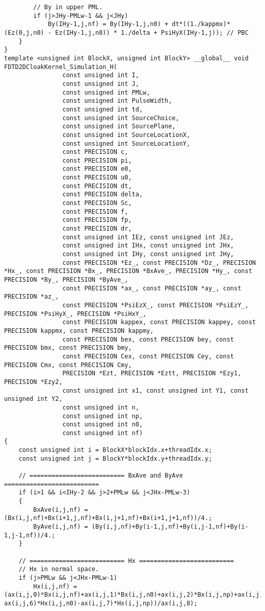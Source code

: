 \begin{lstlisting}
		// By in upper PML.
		if (j>JHy-PMLw-1 && j<JHy)
			By(IHy-1,j,nf) = By(IHy-1,j,n0) + dt*((1./kappmx)*(Ez(0,j,n0) - Ez(IHy-1,j,n0)) * 1./delta + PsiHyX(IHy-1,j)); // PBC
	}
}
template <unsigned int BlockX, unsigned int BlockY> __global__ void FDTD2DCloakKernel_Simulation_H(
				const unsigned int I,
				const unsigned int J,
				const unsigned int PMLw,
				const unsigned int PulseWidth,
				const unsigned int td,
				const unsigned int SourceChoice,
				const unsigned int SourcePlane,
				const unsigned int SourceLocationX,
				const unsigned int SourceLocationY,
				const PRECISION c,
				const PRECISION pi,
				const PRECISION e0,
				const PRECISION u0,
				const PRECISION dt,
				const PRECISION delta,
				const PRECISION Sc,
				const PRECISION f,
				const PRECISION fp,
				const PRECISION dr,
				const unsigned int IEz, const unsigned int JEz,
				const unsigned int IHx, const unsigned int JHx,
				const unsigned int IHy, const unsigned int JHy,
				const PRECISION *Ez_, const PRECISION *Dz_, PRECISION *Hx_, const PRECISION *Bx_, PRECISION *BxAve_, PRECISION *Hy_, const PRECISION *By_, PRECISION *ByAve_,
				const PRECISION *ax_, const PRECISION *ay_, const PRECISION *az_,
				const PRECISION *PsiEzX_, const PRECISION *PsiEzY_, PRECISION *PsiHyX_, PRECISION *PsiHxY_,
				const PRECISION kappex, const PRECISION kappey, const PRECISION kappmx, const PRECISION kappmy,
				const PRECISION bex, const PRECISION bey, const PRECISION bmx, const PRECISION bmy,
				const PRECISION Cex, const PRECISION Cey, const PRECISION Cmx, const PRECISION Cmy,
				PRECISION *Ezt, PRECISION *Eztt, PRECISION *Ezy1, PRECISION *Ezy2,
				const unsigned int x1, const unsigned int Y1, const unsigned int Y2,
				const unsigned int n,
				const unsigned int np,
				const unsigned int n0,
				const unsigned int nf)
{
	const unsigned int i = BlockX*blockIdx.x+threadIdx.x;
	const unsigned int j = BlockY*blockIdx.y+threadIdx.y;

	// ========================== BxAve and ByAve ==========================
	if (i>1 && i<IHy-2 && j>2+PMLw && j<JHx-PMLw-3)
	{
		BxAve(i,j,nf) = (Bx(i,j,nf)+Bx(i+1,j,nf)+Bx(i,j+1,nf)+Bx(i+1,j+1,nf))/4.;
		ByAve(i,j,nf) = (By(i,j,nf)+By(i-1,j,nf)+By(i,j-1,nf)+By(i-1,j-1,nf))/4.;
	}

	// ========================== Hx ==========================
	// Hx in normal space.
	if (j>PMLw && j<JHx-PMLw-1)
		Hx(i,j,nf) = (ax(i,j,0)*Bx(i,j,nf)+ax(i,j,1)*Bx(i,j,n0)+ax(i,j,2)*Bx(i,j,np)+ax(i,j,3)*ByAve(i,j,nf)+ax(i,j,4)*ByAve(i,j,n0)+ax(i,j,5)*ByAve(i,j,np)-ax(i,j,6)*Hx(i,j,n0)-ax(i,j,7)*Hx(i,j,np))/ax(i,j,8);


\end{lstlisting}
